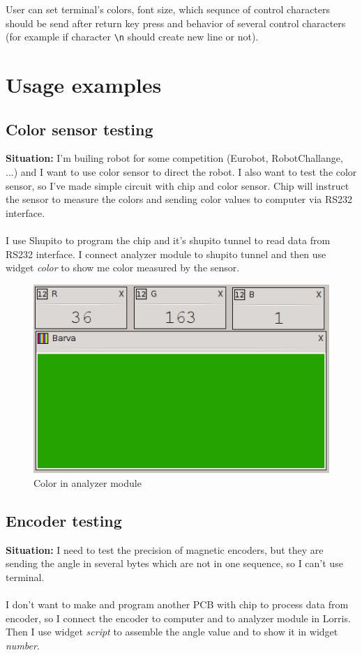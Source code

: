 \documentclass[12pt, a4paper, oneside]{article}
\newcommand{\It}{\textit}  %
\begin{document}
User can set terminal's colors, font size, which sequnce of control characters should be send after return key press and behavior of several control characters (for example if character \verb|\n| should create new line or not).

\newpage
\section{Usage examples}
\subsection{Color sensor testing}
{\bf Situation:} I'm builing robot for some competition (Eurobot, RobotChallange, ...) and I want to use color sensor to direct the robot. I also want to test the color sensor, so I've made simple circuit with chip and color sensor. Chip will instruct the sensor to measure the colors and sending color values to computer via RS232 interface.\\
\\
 I use Shupito to program the chip and it's shupito tunnel to read data from RS232 interface. I connect analyzer module to shupito tunnel and then use widget \It{color} to show me color measured by the sensor.

\begin{figure}[h]
\begin{center}
\includegraphics{img/use_color.png}
\caption{Color in analyzer module}
\end{center}
\end{figure}

\newpage
\subsection{Encoder testing}
{\bf Situation:} I need to test the precision of magnetic encoders, but they are sending the angle in several bytes which are not in one sequence, so I can't use terminal.\\
\\
 I don't want to make and program another PCB with chip to process data from encoder, so I connect the encoder to computer and to analyzer module in Lorris. Then I use widget \It{script} to assemble the angle value and to show it in widget \It{number}.
\end{document}
